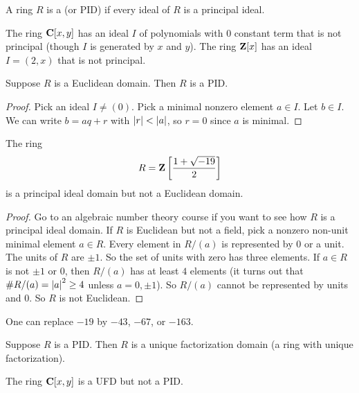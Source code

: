 \documentclass[11pt, oneside,margin=1in]{article}
\begin{document}
\begin{definition}
A ring $R$ is a  (or {PID}) if every ideal of $R$ is a principal ideal.
\end{definition}

\begin{example}
The ring $\mathbf C[x,y]$ has an ideal $I$ of polynomials with $0$ constant term that is not principal (though $I$ is generated by $x$ and $y$). The ring $\mathbf Z[x]$ has an ideal $I =(2,x)$ that is not principal.
\end{example}

\begin{proposition}
Suppose $R$ is a Euclidean domain. Then $R$ is a PID.
\end{proposition}
\begin{proof}
Pick an ideal $I\ne(0)$. Pick a minimal nonzero element $a\in I$. Let $b\in I$. We can write $b=aq+r$ with $\left \lvert r \right \rvert < \left \lvert a \right \rvert$, so $r=0$ since $a$ is minimal.
\end{proof}
\begin{example}
The ring 
$$
R = \mathbf Z\left [ \frac{1 + \sqrt{-19}}{2}\right]
$$
is a principal ideal domain but not a Euclidean domain.
\end{example}
\begin{proof}
Go to an algebraic number theory course if you want to see how $R$ is a principal ideal domain. If $R$ is Euclidean but not a field, pick a nonzero non-unit minimal element $a\in R$. Every element in $R/(a)$ is represented by $0$ or a unit. The units of $R$ are $\pm 1$. So the set of units with zero has three elements. If $a\in R$ is not $\pm 1$ or $0$, then $R/(a)$ has at least $4$ elements (it turns out that $\# R/(a) = \left \lvert a \right \rvert^2\ge 4$ unless $a=0,\pm1$). So $R/(a)$ cannot be represented by units and $0$. So $R$ is not Euclidean. 
\end{proof}

One can replace $-19$ by $-43$, $-67$, or $-163$.

\begin{proposition}
Suppose $R$ is a PID. Then $R$ is a unique factorization domain (a ring with unique factorization).
\end{proposition}

\begin{example}
The ring $\mathbf C[x,y]$ is a UFD but not a PID.
\end{example}
\end{document}

